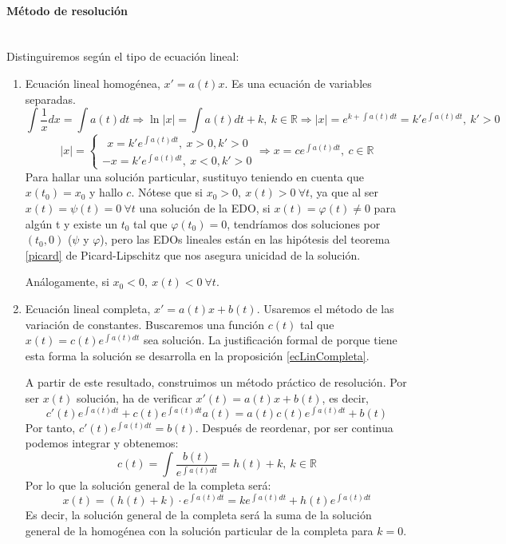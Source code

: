\documentclass[11pt, a4paper,twoside]{article}
\theoremstyle{theorem-style}  %
\theoremstyle{definition-style}
\theoremstyle{example-style}
\providecommand{\abs}[1]{\left\lvert#1\right\rvert} %
\begin{document}
\paragraph{Método de resolución} \ \\
Distinguiremos según el tipo de ecuación lineal:
\begin{enumerate}[\quad i)]
	\item Ecuación lineal homogénea, $ x'=a(t)x $. Es una ecuación de variables separadas.
	\[ \int\frac{1}{x}dx=\int a(t)dt\Rightarrow\ln\abs{x}=\int a(t)dt+k, \ k\in\mathbb{R}\Rightarrow\abs{x}=e^{k+\int a(t)dt}=k'e^{\int a(t)dt}, \ k'>0 \]
	\[ \abs{x}=\begin{cases}
	\ \ x=k'e^{\int a(t)dt}, \ x>0, k'>0\\
	-x=k'e^{\int a(t)dt}, \ x<0, k'>0
	\end{cases}\Rightarrow x=ce^{\int a(t)dt}, \ c\in \mathbb{R}  \]
	Para hallar una solución particular, sustituyo teniendo en cuenta que $ x(t_0)=x_0 $ y hallo $ c $. Nótese que si $ x_0>0,\ x(t)>0\ \forall t $, ya que al ser $ x(t)= \psi(t)=0 \ \forall t$ una solución de la EDO, si $ x(t)= \varphi(t)\neq0 $ para algún t y existe un $ t_0 $ tal que $ \varphi(t_0)=0 $, tendríamos dos soluciones por $ (t_0,0) $ ($ \psi $ y $ \varphi $), pero las EDOs lineales están en las hipótesis del teorema \ref{picard} de Picard-Lipschitz que nos asegura unicidad de la solución.
	
	Análogamente, si $ x_0<0,\ x(t)<0\ \forall t $.
	\item Ecuación lineal completa, $ x'=a(t)x +b(t) $. Usaremos el método de las variación de constantes. Buscaremos una función $ c(t) $ tal que $ x(t)=c(t)e^{\int a(t) dt} $ sea solución. La justificación formal de porque tiene esta forma la solución se desarrolla en la proposición \ref{ecLinCompleta}.
	
	A partir de este resultado, construimos un método práctico de resolución. Por ser $ x(t) $ solución, ha de verificar $ x'(t)=a(t)x+b(t) $, es decir,
	\[ c'(t)e^{\int a(t)dt}+c(t)e^{\int a(t)dt}a(t)=a(t)c(t)e^{\int a(t)dt}+b(t) \]
	Por tanto, $ c'(t)e^{\int a(t)dt}=b(t) $. Después de reordenar, por ser continua podemos integrar y obtenemos:
	\[ c(t)=\int \frac{b(t)}{e^{\int a(t)dt}}=h(t)+k, \ k\in \mathbb{R} \]
	Por lo que la solución general de la completa será:
	\[ x(t)=(h(t)+k)\cdot e^{\int a(t)dt}=ke^{\int a(t)dt}+h(t)e^{\int a(t)dt} \]
	Es decir, la solución general de la completa será la suma de la solución general de la homogénea con la solución particular de la completa para $ k=0 $.
\end{enumerate}
\end{document}
